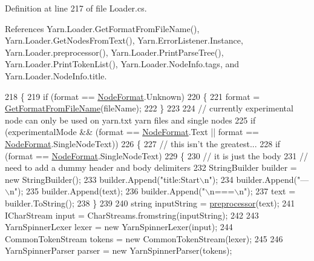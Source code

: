 Definition at line 217 of file Loader.\-cs.



References Yarn.\-Loader.\-Get\-Format\-From\-File\-Name(), Yarn.\-Loader.\-Get\-Nodes\-From\-Text(), Yarn.\-Error\-Listener.\-Instance, Yarn.\-Loader.\-preprocessor(), Yarn.\-Loader.\-Print\-Parse\-Tree(), Yarn.\-Loader.\-Print\-Token\-List(), Yarn.\-Loader.\-Node\-Info.\-tags, and Yarn.\-Loader.\-Node\-Info.\-title.


\begin{DoxyCode}
218         \{
219             \textcolor{keywordflow}{if} (format == \hyperlink{a00041_ad7ebb46e7309ead8767383a672b3272f}{NodeFormat}.Unknown)
220             \{
221                 format = \hyperlink{a00123_a080b2d6b7553c178007c04297d50e9da}{GetFormatFromFileName}(fileName);
222             \}
223 
224             \textcolor{comment}{// currently experimental node can only be used on yarn.txt yarn files and single nodes}
225             \textcolor{keywordflow}{if} (experimentalMode && (format == \hyperlink{a00041_ad7ebb46e7309ead8767383a672b3272f}{NodeFormat}.Text || format == 
      \hyperlink{a00041_ad7ebb46e7309ead8767383a672b3272f}{NodeFormat}.SingleNodeText))
226             \{
227                 \textcolor{comment}{// this isn't the greatest...}
228                 \textcolor{keywordflow}{if} (format == \hyperlink{a00041_ad7ebb46e7309ead8767383a672b3272f}{NodeFormat}.SingleNodeText)
229                 \{
230                     \textcolor{comment}{// it is just the body}
231                     \textcolor{comment}{// need to add a dummy header and body delimiters}
232                     StringBuilder builder = \textcolor{keyword}{new} StringBuilder();
233                     builder.Append(\textcolor{stringliteral}{"title:Start\(\backslash\)n"});
234                     builder.Append(\textcolor{stringliteral}{"---\(\backslash\)n"});
235                     builder.Append(text);
236                     builder.Append(\textcolor{stringliteral}{"\(\backslash\)n===\(\backslash\)n"});
237                     text = builder.ToString();
238                 \}
239 
240                 \textcolor{keywordtype}{string} inputString = \hyperlink{a00123_a0b09a29edd2ed13d52203f1b71a47081}{preprocessor}(text);
241                 ICharStream input = CharStreams.fromstring(inputString);
242 
243                 YarnSpinnerLexer lexer = \textcolor{keyword}{new} YarnSpinnerLexer(input);
244                 CommonTokenStream tokens = \textcolor{keyword}{new} CommonTokenStream(lexer);
245 
246                 YarnSpinnerParser parser = \textcolor{keyword}{new} YarnSpinnerParser(tokens);

\end{DoxyCode}

